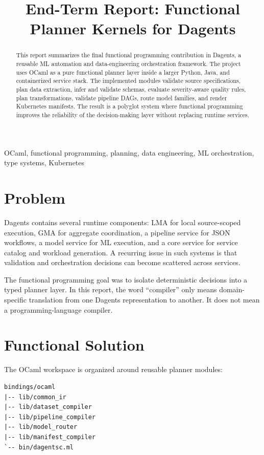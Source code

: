 \documentclass[conference]{IEEEtran}
\title{End-Term Report: Functional Planner Kernels for Dagents}
\author{
\IEEEauthorblockN{Pradyun Devarakonda \quad Dheeraj Rajanala}
\IEEEauthorblockA{
Course Project for Programming Languages\\
Roll Number: IMT2022525, IMT2022093}
}
\begin{document}
\maketitle

\begin{abstract}
This report summarizes the final functional programming contribution in
Dagents, a reusable ML automation and data-engineering orchestration framework.
The project uses OCaml as a pure functional planner layer inside a larger
Python, Java, and containerized service stack. The implemented modules validate
source specifications, plan data extraction, infer and validate schemas,
evaluate severity-aware quality rules, plan transformations, validate pipeline
DAGs, route model families, and render Kubernetes manifests. The result is a
polyglot system where functional programming improves the reliability of the
decision-making layer without replacing runtime services.
\end{abstract}

\begin{IEEEkeywords}
OCaml, functional programming, planning, data engineering, ML orchestration,
type systems, Kubernetes
\end{IEEEkeywords}

\section{Problem}

Dagents contains several runtime components: LMA for local source-scoped
execution, GMA for aggregate coordination, a pipeline service for JSON
workflows, a model service for ML execution, and a core service for service
catalog and workload generation. A recurring issue in such systems is that
validation and orchestration decisions can become scattered across services.

The functional programming goal was to isolate deterministic decisions into a
typed planner layer. In this report, the word ``compiler'' only means
domain-specific translation from one Dagents representation to another. It does
not mean a programming-language compiler.

\section{Functional Solution}

The OCaml workspace is organized around reusable planner modules:

\begin{lstlisting}[style=demostyle]
bindings/ocaml
|-- lib/common_ir
|-- lib/dataset_compiler
|-- lib/pipeline_compiler
|-- lib/model_router
|-- lib/manifest_compiler
`-- bin/dagentsc.ml
\end{lstlisting}
\end{document}
